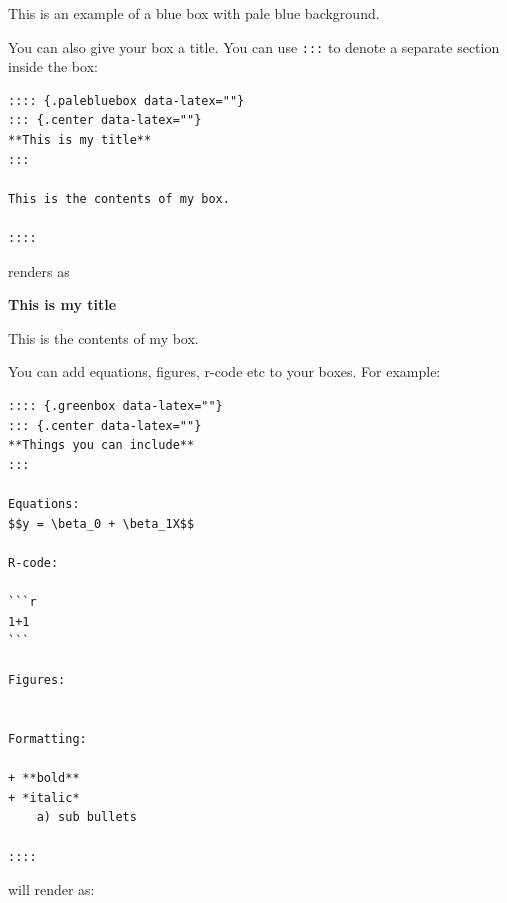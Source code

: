 \documentclass[
  oneside]{krantz}
\theoremstyle{definition}
\theoremstyle{definition}
\theoremstyle{definition}
\theoremstyle{remark}
\begin{document}
\begin{palebluebox}

This is an example of a blue box with pale blue background.

\end{palebluebox}

You can also give your box a title. You can use \texttt{:::} to denote a separate section inside the box:

\begin{verbatim}
:::: {.palebluebox data-latex=""}
::: {.center data-latex=""}
**This is my title**
:::

This is the contents of my box.

::::
\end{verbatim}

renders as

\begin{palebluebox}

\begin{center}

\textbf{This is my title}

\end{center}

This is the contents of my box.

\end{palebluebox}

You can add equations, figures, r-code etc to your boxes. For example:

\begin{verbatim}
:::: {.greenbox data-latex=""}
::: {.center data-latex=""}
**Things you can include**
:::

Equations: 
$$y = \beta_0 + \beta_1X$$

R-code:

```r
1+1
```

Figures:


Formatting:

+ **bold**
+ *italic*
    a) sub bullets

::::
\end{verbatim}

will render as:
\end{document}
